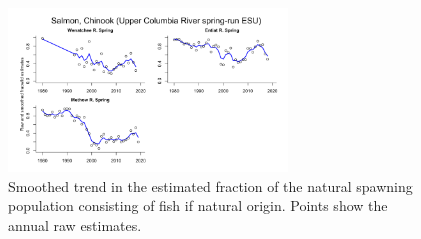 \documentclass[
  letterpaper,
  oneside,
  open=any]{scrbook}
\begin{document}
\begin{figure}

{\centering \includegraphics[width=2.92in,height=\textheight]{content/Interior_Columbia/../../media/image13.png}

}

\caption{\label{fig-UC-Spr-Chinook-smoothed-frac-wild}Smoothed trend in
the estimated fraction of the natural spawning population consisting of
fish if natural origin. Points show the annual raw estimates.}

\end{figure}
\end{document}

